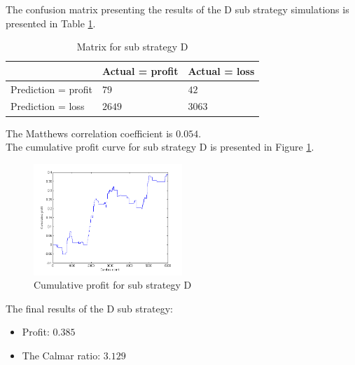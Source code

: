 \documentclass{jtacs}
\begin{document}
The confusion matrix presenting the results of the D sub strategy simulations is presented in Table \ref{tab11}.
\begin{table}[ht]
\centering
\caption{Matrix for sub strategy D}
\label{tab11}
\begin{tabular}{|l|l|l|}\hline
&	Actual = profit	& Actual = loss\\ \hline
Prediction = profit & $79$	& $42$ \\ \hline
Prediction = loss &	$2649$ &	$3063$ \\ \hline
\end{tabular}
\end{table}
\FloatBarrier
\noindent The Matthews correlation coefficient is $0.054$.\\
The cumulative profit curve for sub strategy D is presented in Figure \ref{rys11}.
\begin{figure}[ht]
\centering
\includegraphics[width = 0.5\textwidth]{pictures/PivotPointsD.png}
\caption{Cumulative profit for sub strategy D}
\label{rys11}
\end{figure}
\FloatBarrier	
The final results of the D sub strategy:
\begin{itemize}
\item Profit: $0.385$
\item The Calmar ratio: $3.129$
\end{itemize}



\end{document}
